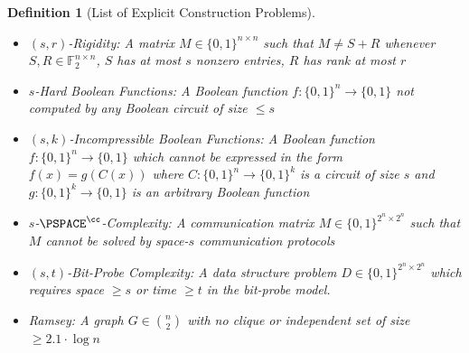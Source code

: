 \documentclass[11pt]{article}
\newtheorem{definition}{Definition}
\newcommand{\B}{\{0,1\}}
\begin{document}
\begin{definition}[List of Explicit Construction Problems]\label{def:list-of-problems}
~
\begin{itemize}
    \item $(s,r)$-Rigidity: A matrix $M \in \B^{n \times n}$ such that $M \neq S + R$ whenever $S,R \in \mathbb{F}_2^{n \times n}$, $S$ has at most $s$ nonzero entries, $R$ has rank at most $r$
    \item $s$-Hard Boolean Functions: A Boolean function $f: \B^n \to \B$ not computed by any Boolean circuit of size $\leq s$
    \item $(s,k)$-Incompressible Boolean Functions: A Boolean function $f: \B^n \to \B$ which cannot be expressed in the form $f(x) = g(C(x))$ where $C: \B^n \to \B^k$ is a circuit of size $s$ and $g: \B^k \to \B$ is an arbitrary Boolean function
    \item $s$-$\PSPACE^{\cc}$-Complexity: A communication matrix $M \in \B^{2^n \times 2^n}$ such that $M$ cannot be solved by space-$s$ communication protocols
    \item $(s,t)$-Bit-Probe Complexity: A data structure problem $D \in \B^{2^n \times 2^n}$ which requires space $\geq s$ or time $\geq t$ in the bit-probe model.
    \item Ramsey: A graph $G \in \binom{n}{2}$ with no clique or independent set of size $\geq 2.1 \cdot  \log n$
\end{itemize}
\end{definition}
\end{document}
